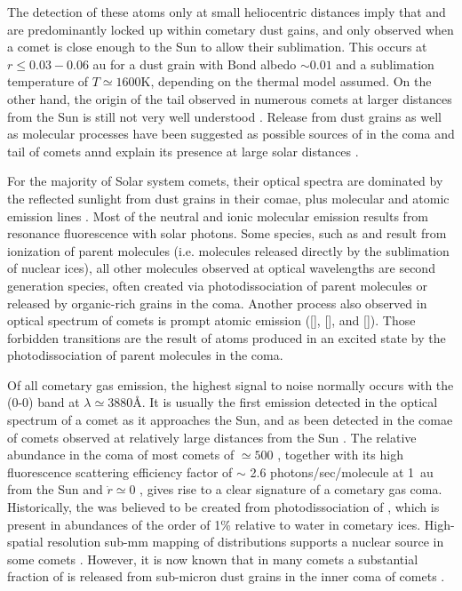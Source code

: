 \documentclass{aa}
\begin{document}
The detection of these atoms only at small heliocentric distances imply that  and  are predominantly locked up within cometary dust gains, and only observed when a comet is close enough to the Sun to allow their sublimation.
%
This occurs at $r\leq 0.03-0.06$ au for a dust grain with Bond albedo $\sim0.01$ and a sublimation temperature of $T\simeq 1600$K, depending on the thermal model assumed.
%
On the other hand, the origin of the  tail observed in numerous comets at larger distances from the Sun is still not very well understood \citep{Cremonese02}.
%
Release from dust grains as well as molecular processes have been suggested as possible sources of  in the coma and tail of comets annd explain its presence at large solar distances \citep{Cremonese1997}.

For the majority of Solar system comets, their optical spectra are dominated by the reflected sunlight from dust grains in their comae, plus molecular and atomic emission lines \citep[e.g. ][]{hyland2019}.
%
Most of the neutral and ionic molecular emission results from resonance fluorescence with solar photons.
%
Some species, such as  and  result from ionization of parent molecules (i.e. molecules released directly by the sublimation of nuclear ices), all other molecules observed at optical wavelengths are second generation species, often created via photodissociation of parent molecules or released by organic-rich grains in the coma.
%
Another process also observed in optical spectrum of comets is prompt atomic emission  ([], [], and []).
%
Those forbidden transitions are the result of atoms produced in an excited state by the photodissociation of parent molecules in the coma. 

Of all cometary gas emission, the highest signal to noise normally occurs with the  (0-0) band at $\lambda\simeq 3880$\AA.
%
It is usually the first emission detected in the optical spectrum of a comet as it approaches the Sun, and as been detected in the comae of comets observed at relatively large distances from the Sun \citep[e.g. ][]{Bus1991,Fitzsimmons1996}.
%
The relative abundance in the coma of most comets of $\simeq500$ \citep{AHearn1995}, together with its high fluorescence scattering efficiency factor of $\sim$ 2.6 photons/sec/molecule at 1~au from the Sun and $\dot{r}\simeq 0$ \citep{Schleicher2010}, gives rise to a clear signature of a cometary gas coma.
%
Historically, the  was believed to be created from photodissociation of , which is present in abundances of the order of 1\% relative to water in cometary ices.
%
High-spatial resolution sub-mm mapping of  distributions supports a nuclear source in some comets \citep{Cordiner2014}.
%
However, it is now known that in many comets a substantial fraction of  is released from sub-micron dust grains in the inner coma of comets \citep[e.g. ][]{Fray2005}. 
\end{document}
